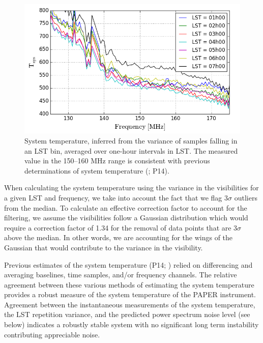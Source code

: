 \documentclass[twocolumn,numberedappendix]{emulateapj} \shorttitle{New Limits on the 21 cm Power Spectrum at $z=8.4$}
\begin{document}
\begin{figure}\centering
\includegraphics[width=\columnwidth]{plots/tsys.png}
\caption{System temperature, inferred from the variance of samples falling 
in an LST bin, averaged over one-hour intervals in LST.  The measured value
in the 150--160 MHz range is consistent with previous determinations of
system temperature (\citealt{jacobs_et_al2014}; P14).
}\label{fig:tsys}
\end{figure}

When calculating the system temperature using the variance in the visibilities
for a given LST and frequency, we take into account the fact that we flag
3$\sigma$ outliers from the median. To calculate an effective correction factor
to account for the filtering, we assume the visibilities follow a Gaussian
distribution which would require a correction factor of 1.34 for the removal of
data points that are 3$\sigma$ above the median. In other words, we are
accounting for the wings of the Gaussian that would contribute to the variance
in the visibility.

Previous estimates
of the system temperature
(P14; \citealt{jacobs_et_al2014}) relied on differencing and averaging
baselines, time samples, and/or frequency channels. The relative agreement
between these various methods of estimating the system temperature provides a
robust measure of the system temperature of the PAPER instrument. Agreement
between the instantaneous measurements of the system temperature, the LST
repetition variance, and the predicted power spectrum noise level (see below)
indicates a robustly stable system with no significant long term instability
contributing appreciable noise.
\end{document}
